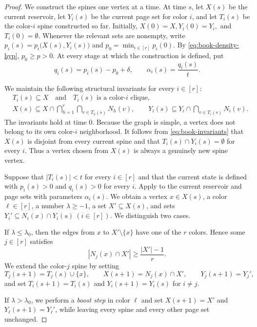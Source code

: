 \documentclass[10pt,a4paper]{amsart}
\begin{document}
\begin{proof}
We construct the spines one vertex at a time. At time $s$, let $X(s)$ be the
current reservoir, let $Y_i(s)$ be the current page set for color $i$, and
let $T_i(s)$ be the color-$i$ spine constructed so far. Initially,
$
 X(0)=X,
 Y_i(0)=Y_i,$ and $
 T_i(0)=\emptyset.
$
Whenever the relevant sets are nonempty, write
$p_i(s)=p_i\bigl(X(s),Y_i(s)\bigr)$ and $ p_0=\min_{i\in[r]}p_i(0).
$
By \eqref{eq:book-density-hyp}, $p_0\ge p>0$. At every stage at which the
construction is defined, put
\begin{equation}\label{eq:q-alpha}
 q_i(s)=p_i(s)-p_0+\delta,
 \qquad
 \alpha_i(s)=\frac{q_i(s)}{t}.
\end{equation}

We maintain the following structural invariants for every $i\in[r]$:
\begin{equation}\label{eq:book-invariants}
 \begin{aligned}
 &T_i(s)\subseteq X
   \quad\text{and}\quad T_i(s)\text{ is a color-$i$ clique},\\
 &X(s)\subseteq X\cap
   \bigcap_{h=1}^r\bigcap_{v\in T_h(s)}N_h(v),\qquad Y_i(s)\subseteq Y_i\cap\bigcap_{v\in T_i(s)}N_i(v).
 \end{aligned}
\end{equation}
The invariants hold at time $0$. Because the graph is simple, a vertex does
not belong to its own color-$i$ neighborhood. It follows from
\eqref{eq:book-invariants} that $X(s)$ is disjoint from every current spine
and that $T_i(s)\cap Y_i(s)=\emptyset$ for every $i$. Thus a vertex chosen
from $X(s)$ is always a genuinely new spine vertex.

Suppose that $|T_i(s)|<t$ for every $i\in[r]$ and that the current state is
defined with $p_i(s)>0$ and $q_i(s)>0$ for every $i$. Apply
 to the current reservoir and page sets with parameters
$\alpha_i(s)$. We obtain a vertex $x\in X(s)$, a color $\ell\in[r]$, a
number $\lambda\ge-1$, a set $X'\subseteq X(s)$, and sets
$
 Y_i'\subseteq N_i(x)\cap Y_i(s)
~(i\in[r]).
$
We distinguish two cases.

If $\lambda\le\lambda_0$, then the edges from $x$ to
$X'\setminus\{x\}$ have one of the $r$ colors. Hence some $j\in[r]$
satisfies
\[
 |N_j(x)\cap X'|\ge\frac{|X'|-1}{r}.
\]
We extend the color-$j$ spine by setting
\[
 T_j(s+1)=T_j(s)\cup\{x\},
 \qquad
 X(s+1)=N_j(x)\cap X',
 \qquad
 Y_j(s+1)=Y_j',
\]
and set $T_i(s+1)=T_i(s)$ and $Y_i(s+1)=Y_i(s)$ for $i\ne j$.

If $\lambda>\lambda_0$, we perform a \emph{boost step} in color $\ell$ and
set
$
 X(s+1)=X'$
and $Y_\ell(s+1)=Y_\ell'$,
while leaving every spine and every other page set unchanged.


\end{proof}
\end{document}
